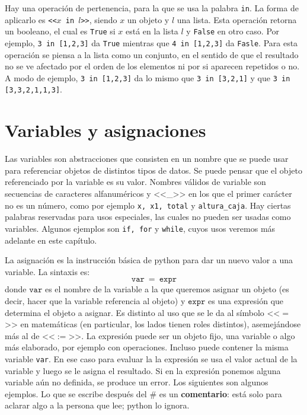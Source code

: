 \documentclass[a4paper, 12pt]{report}
\theoremstyle{definition}
\begin{document}
Hay una operación de pertenencia, para la que se usa la palabra {\tt in}. La forma de aplicarlo es {\tt <<$x$ in $l$>>}, siendo $x$ un objeto y $l$ una lista. Esta operación retorna un booleano, el cual es {\tt True} si $x$ está en la lista $l$ y {\tt False} en otro caso. Por ejemplo, {\tt 3 in [1,2,3]} da {\tt True} mientras que {\tt 4 in [1,2,3]} da {\tt Fasle}. Para esta operación se piensa a la lista como un conjunto, en el sentido de que el resultado no se ve afectado por el orden de los elementos ni por si aparecen repetidos o no. A modo de ejemplo, {\tt 3 in [1,2,3]} da lo mismo que {\tt 3 in [3,2,1]} y que {\tt 3 in [3,3,2,1,1,3]}.


\section{Variables y asignaciones}

Las variables son abstracciones que consisten en un nombre que se puede usar para referenciar objetos de distintos tipos de datos. Se puede pensar que el objeto referenciado por la variable es su valor. Nombres válidos de variable son secuencias de caracteres alfanuméricos y <<\_>> en los que el primer carácter no es un número, como por ejemplo {\tt x, x1, total} y {\tt altura\_caja}. Hay ciertas palabras reservadas para usos especiales, las cuales no pueden ser usadas como variables. Algunos ejemplos son {\tt if, for} y {\tt while}, cuyos usos veremos más adelante en este capítulo.

La asignación es la instrucción básica de python para dar un nuevo valor a una variable. La sintaxis es:
$$\mathtt{var}~=~\mathtt{expr}$$
donde $\mathtt{var}$ es el nombre de la variable a la que queremos asignar un objeto (es decir, hacer que la variable referencia al objeto) y $\mathtt{expr}$ es una expresión que determina el objeto a asignar.  Es distinto al uso que se le da al símbolo <<$=$>> en matemáticas (en particular, los lados tienen roles distintos), asemejándose más al de <<$:=$>>. La expresión puede ser un objeto fijo, una variable o algo más elaborado, por ejemplo con operaciones. Incluso puede contener la misma variable {\tt var}. En ese caso para evaluar la la expresión se usa el valor actual de la variable y luego se le asigna el resultado. Si en la expresión ponemos alguna variable aún no definida, se produce un error. Los siguientes son algunos ejemplos. Lo que se escribe después del \# es un {\bf comentario}: está solo para aclarar algo a la persona que lee; python lo ignora.
\end{document}

